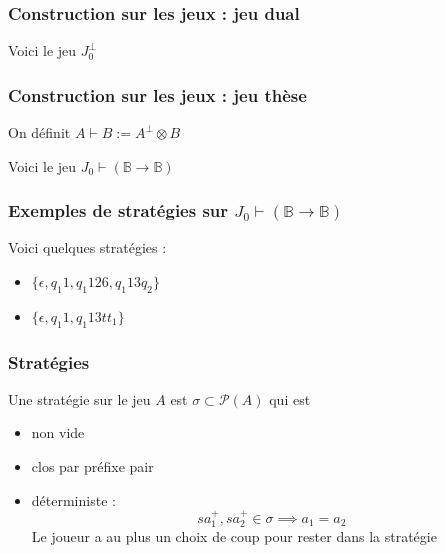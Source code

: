 \documentclass{beamer}
\begin{document}
\begin{frame}
\frametitle{Construction sur les jeux : jeu dual}

Voici le jeu $J_0^\bot$


\end{frame}

\begin{frame}
\frametitle{Construction sur les jeux : jeu thèse}

On définit $A\vdash B := A^\bot \otimes B$

Voici le jeu $J_0\vdash (\mathbb{B} \rightarrow \mathbb{B})$

 
\end{frame}

\begin{frame}
\frametitle{Exemples de stratégies sur $J_0\vdash  (\mathbb{B} \rightarrow \mathbb{B})$}

 

Voici quelques stratégies :
\begin{itemize}
\item $\{\epsilon, q_1 1, q_1 1 2 6, q_1 1 3 q_2\}$
\pause
\item $\{\epsilon,q_1 1, q_1 1 3 tt_1\}$
\end{itemize}

\end{frame}

\begin{frame}
\frametitle{Stratégies}


Une stratégie sur le jeu $A$ est $\sigma \subset \mathcal{P}(A)$ qui est
\begin{itemize}
\item non vide
\item clos par préfixe pair
\item déterministe :
\begin{equation*} sa_1^+, sa_2^+ \in \sigma \implies a_1 = a_2 \end{equation*}
Le joueur a au plus un choix de coup pour rester dans la stratégie

\end{itemize}

\end{frame}
\end{document}
